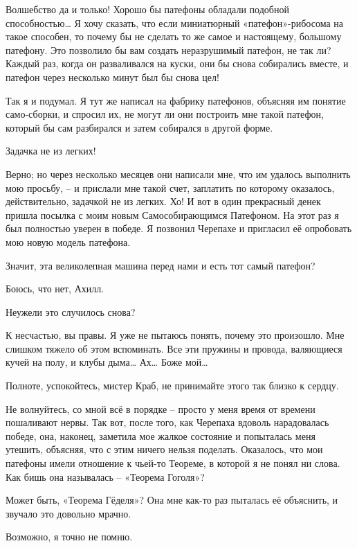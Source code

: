\documentclass[../main.tex]{subfiles}
\begin{document}
\begin{dialogue}
 Волшебство да и только! Хорошо бы патефоны обладали подобной способностью\ldots{} Я хочу сказать, что если миниатюрный «патефон»-рибосома на такое способен, то почему бы не сделать то же самое и настоящему, большому патефону. Это позволило бы вам создать неразрушимый патефон, не так ли? Каждый раз, когда он разваливался на куски, они бы снова собирались вместе, и патефон через несколько минут был бы снова цел!

 Так я и подумал. Я тут же написал на фабрику патефонов, объясняя им понятие само-сборки, и спросил их, не могут ли они построить мне такой патефон, который бы сам разбирался и затем собирался в другой форме.

 Задачка не из легких!

 Верно; но через несколько месяцев они написали мне, что им удалось выполнить мою просьбу, \--- и прислали мне такой счет, заплатить по которому оказалось, действительно, задачкой не из легких. Хо! И вот в один прекрасный денек пришла посылка с моим новым Самособирающимся Патефоном. На этот раз я был полностью уверен в победе. Я позвонил Черепахе и пригласил её опробовать мою новую модель патефона.

 Значит, эта великолепная машина перед нами и есть тот самый патефон?

 Боюсь, что нет, Ахилл.

 Неужели это случилось снова?

 К несчастью, вы правы. Я уже не пытаюсь понять, почему это произошло. Мне слишком тяжело об этом вспоминать. Все эти пружины и провода, валяющиеся кучей на полу, и клубы дыма\ldots{} Ах\ldots{} Боже мой\ldots{}

 Полноте, успокойтесь, мистер Краб, не принимайте этого так близко к сердцу.

 Не волнуйтесь, со мной всё в порядке \--- просто у меня время от времени пошаливают нервы. Так вот, после того, как Черепаха вдоволь нарадовалась победе, она, наконец, заметила мое жалкое состояние и попыталась меня утешить, объясняя, что с этим ничего нельзя поделать. Оказалось, что мои патефоны имели отношение к чьей-то Теореме, в которой я не понял ни слова. Как бишь она называлась \--- «Теорема Гоголя»?

 Может быть, «Теорема Гёделя»? Она мне как-то раз пыталась её объяснить, и звучало это довольно мрачно.

 Возможно, я точно не помню.


\end{dialogue}
\end{document}
